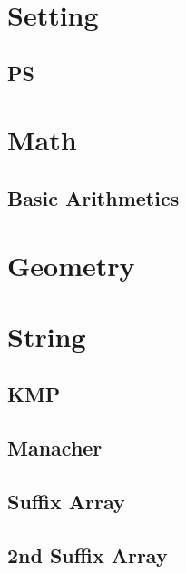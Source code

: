\documentclass[10pt,landscape,a4paper,twocolumn]{article}
\begin{document}
\tableofcontents


\section{Setting}
\subsection{PS}


\section{Math}
\subsection{Basic Arithmetics}





\section{Geometry}



\section{String}
\subsection{KMP}


\subsection{Manacher}


\subsection{Suffix Array}


\subsection{2nd Suffix Array}

\end{document}
